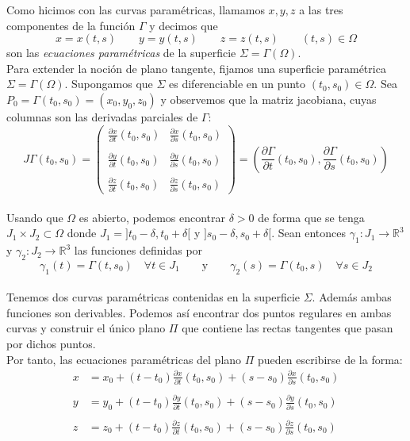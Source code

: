 \documentclass[a4paper, 12pt]{article}
\begin{document}
\begin{enumerate}[label=\textbf{\arabic*}.]
Como hicimos con las curvas paramétricas, llamamos \(x,y,z \) a las tres componentes de la función \(\Gamma\) y decimos que 
\[
	x = x(t,s) \qquad y = y(t,s) \qquad z = z(t,s) \qquad (t,s) \in \Omega
\]
son las \textit{ecuaciones paramétricas} de la superficie \(\Sigma = \Gamma (\Omega)\). \\

Para extender la noción de plano tangente, fijamos una superficie paramétrica \(\Sigma = \Gamma (\Omega)\). Supongamos que \(\Sigma\) es diferenciable en un punto \((t_0, s_0) \in \Omega\). Sea \(P_0 = \Gamma (t_0, s_0) = (x_0, y_0, z_0)\) y observemos que la matriz jacobiana, cuyas columnas son las derivadas parciales de \(\Gamma\):
\[
	J \Gamma (t_0, s_0) = 
\begin{pmatrix}
\frac{\partial x}{\partial t} (t_0, s_0) & \frac{\partial x}{\partial s} (t_0, s_0) \\
\\
\frac{\partial y}{\partial t} (t_0, s_0) & \frac{\partial y}{\partial s} (t_0, s_0) \\
\\
\frac{\partial z}{\partial t} (t_0, s_0) & \frac{\partial z}{\partial s} (t_0, s_0)
\end{pmatrix} = \left( \frac{\partial \Gamma}{\partial t} (t_0, s_0), \frac{\partial \Gamma}{\partial s} (t_0,s_0) \right)
\] \\

Usando que \(\Omega\) es abierto, podemos encontrar \(\delta >0\) de forma que se tenga \(J_1 \times J_2 \subset \Omega\) donde \(J_1 = ] t_0 - \delta, t_0 + \delta[\) y \(]s_0 - \delta, s_0 + \delta[\). Sean entonces \(\gamma_1 : J_1 \to \mathbb{R}^3\) y \(\gamma_2 : J_2 \to \mathbb{R}^3\) las funciones definidas por
\[
	\gamma_1 (t) = \Gamma (t, s_0) \quad \forall t \in J_1 \qquad \text{y} \qquad \gamma_2 (s) = \Gamma(t_0, s) \quad \forall s \in J_2
\] \\

Tenemos dos curvas paramétricas contenidas en la superficie \(\Sigma\). Además ambas funciones son derivables. Podemos así encontrar dos puntos regulares en ambas curvas y construir el único plano \(\Pi\) que contiene las rectas tangentes que pasan por dichos puntos. \\

Por tanto, las ecuaciones paramétricas del plano \(\Pi\) pueden escribirse de la forma:
\begin{equation}\label{parametricas_plano}
\begin{array}{cc}
x &= x_0 + (t-t_0) \frac{\partial x}{\partial t} (t_0,s_0) + (s - s_0) \frac{\partial x}{\partial s} (t_0,s_0) \\
\\
y &= y_0 + (t - t_0) \frac{\partial y}{\partial t} (t_0,s_0) + (s-s_0)\frac{\partial y}{\partial s} (t_0,s_0) \\
\\
z &= z_0 + (t-t_0) \frac{\partial z}{\partial t} (t_0, s_0) + (s - s_0) \frac{\partial z}{\partial s} (t_0,s_0)
\end{array}
\end{equation}


\end{enumerate}
\end{document}
